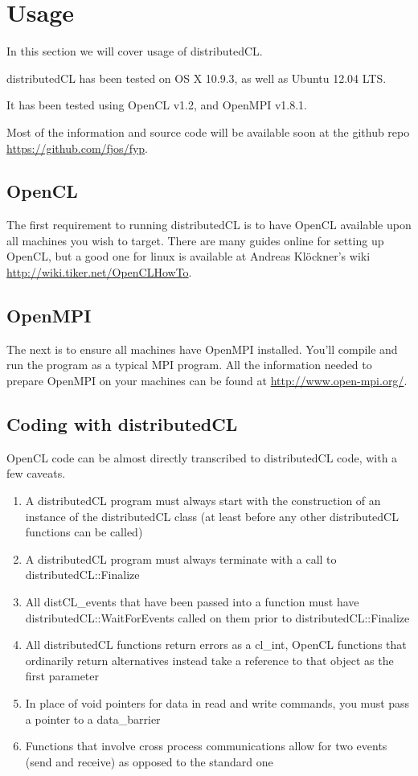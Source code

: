 \documentclass[../thesis.tex]{subfiles}
\begin{document}
\section{Usage} %
\label{sec:usage}

In this section we will cover usage of distributedCL.

distributedCL has been tested on OS X 10.9.3, as well as Ubuntu 12.04 LTS.

It has been tested using OpenCL v1.2, and OpenMPI v1.8.1.

Most of the information and source code will be available soon at the github repo \url{https://github.com/fjos/fyp}.

\subsection{OpenCL} %
\label{sub:opencl_use}
    The first requirement to running distributedCL is to have OpenCL available upon all machines you wish to target. There are many guides online for setting up OpenCL, but a good one for linux is available at Andreas Klöckner's wiki \url{http://wiki.tiker.net/OpenCLHowTo}.
\subsection{OpenMPI} %
\label{sub:openmpi}
    The next is to ensure all machines have OpenMPI installed. You'll compile and run the program as a typical MPI program. All the information needed to prepare OpenMPI on your machines can be found at \url{http://www.open-mpi.org/}.

\subsection{Coding with distributedCL} %
\label{sub:coding_with_distributedcl}
    OpenCL code can be almost directly transcribed to distributedCL code, with a few caveats.
    \begin{enumerate}
    \item A distributedCL program must always start with the construction of an instance of the distributedCL class (at least before any other distributedCL functions can be called)
    \item A distributedCL program must always terminate with a call to distributedCL::Finalize
    \item All distCL\_events that have been passed into a function must have distributedCL::WaitForEvents called on them prior to distributedCL::Finalize
    \item All distributedCL functions return errors as a cl\_int, OpenCL functions that ordinarily return alternatives instead take a reference to that object as the first parameter
    \item In place of void pointers for data in read and write commands, you must pass a pointer to a data\_barrier
    \item Functions that involve cross process communications allow for two events (send and receive) as opposed to the standard one
    \end{enumerate}
    
\end{document}
